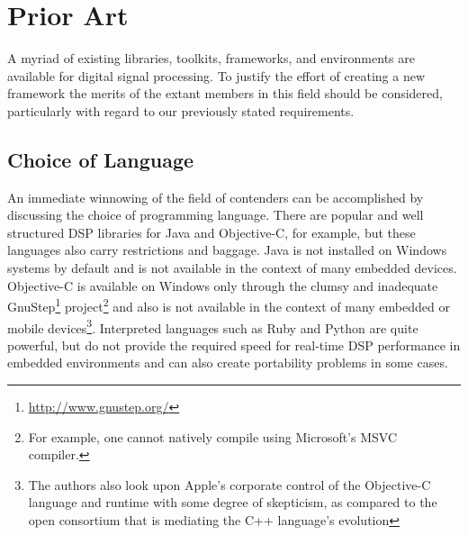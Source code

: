 \documentclass[twoside,10pt]{article}
\begin{document}




\section{Prior Art} %
\label{sec:prior_art}

A myriad of existing libraries, toolkits, frameworks, and environments are available for digital signal processing.  To justify the effort of creating a new framework the merits of the extant members in this field should be considered, particularly with regard to our previously stated requirements.


\subsection{Choice of Language} %

An immediate winnowing of the field of contenders can be accomplished by discussing the choice of programming language.  There are popular and well structured DSP libraries for Java\cite{Guillemard:2005, Burk:1998} and Objective-C\cite{Jaffe:1989,Jaffe:1991}, for example, but these languages also carry restrictions and baggage.  Java is not installed on Windows systems by default and is not available in the context of many embedded devices.  Objective-C is available on Windows only through the clumsy and inadequate GnuStep\footnote{\url{http://www.gnustep.org/}} project\footnote{For example, one cannot natively compile using Microsoft's MSVC compiler.} and also is not available in the context of many embedded or mobile devices\footnote{The authors also look upon Apple's corporate control of the Objective-C language and runtime with some degree of skepticism, as compared to the open consortium that is mediating the C++ language's evolution}.  Interpreted languages such as Ruby and Python are quite powerful, but do not provide the required speed for real-time DSP performance in embedded environments and can also create portability problems in some cases.  
\end{document}
